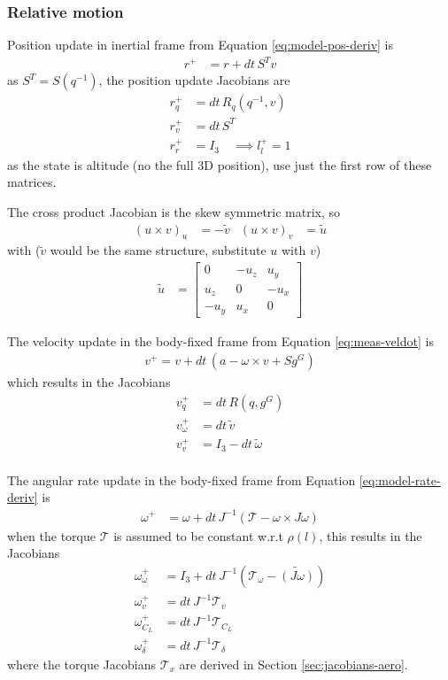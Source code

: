\subsubsection{Relative motion}
Position update in inertial frame from Equation \ref{eq:model-pos-deriv}
is 
\begin{align}
    r^+ &= r + dt \, S^T v
\end{align}
as $S^T = S(q^{-1})$, the position update Jacobians are
\begin{align}
    r^+_q &= dt \, R_q(q^{-1},v) \\
    r^+_v &= dt \, S^T \\
    r^+_r &= I_3 \quad \implies l^+_l = 1
\end{align}
as the state is altitude (no the full 3D position), use just the first row of these matrices. 

The cross product Jacobian is the skew symmetric matrix, so 
\begin{align}
    (u \times v)_u &= - \tilde v 
    &
    (u \times v)_v &= \tilde u
\end{align}
with ($\tilde v$ would be the same structure, substitute $u$ with $v$)
\begin{align}
    \tilde u &= \begin{bmatrix}
        0 & -u_z & u_y \\ u_z & 0 & -u_x \\ -u_y & u_x & 0
    \end{bmatrix} 
\end{align}

The velocity update in the body-fixed frame from Equation \ref{eq:meas-veldot} is
\begin{align}
    v^+ = v + dt \, (a -\omega \times v + S g^G)
\end{align}
which results in the Jacobians
\begin{align}
    v^+_q &= dt \, R(q,g^G) \\
    v^+_\omega &= dt \, \tilde v \\
    v^+_v &= I_3 - dt \, \tilde \omega\\
\end{align}

The angular rate update in the body-fixed frame from Equation \ref{eq:model-rate-deriv} is
\begin{align}
   \omega^+ &= \omega + dt \, J^{-1} (\mathcal{T} - \omega \times J \omega)
\end{align}
when the torque $\mathcal{T}$ is assumed to be constant w.r.t $\rho(l)$, this results in the Jacobians
\begin{align}
    \omega^+_\omega &= I_3 + dt \,  J^{-1} (\mathcal{T}_\omega - \tilde {(J \omega)} )  \\
    \omega^+_v &= dt \, J^{-1} \mathcal{T}_v \\
    \omega^+_{C_L} &= dt \, J^{-1} \mathcal{T}_{C_L} \\
    \omega^+_\delta &= dt \, J^{-1} \mathcal{T}_\delta
\end{align}
where the torque Jacobians $\mathcal{T}_x$ are derived in Section \ref{sec:jacobians-aero}.


